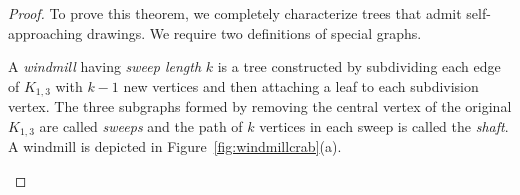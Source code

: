 \documentclass[11pt]{article}
\newcommand{\changeAL}[1]{{#1}}
\begin{document}
\begin{proof}
To prove this theorem, we completely characterize trees that admit self-approaching drawings.  We require two definitions of special graphs.

A \emph{windmill} having \emph{sweep length} $k$ is a tree constructed by subdividing
each edge of $K_{1,3}$ with $k-1$ new vertices
and then attaching a leaf to each subdivision vertex.
\changeAL{The three subgraphs formed by removing the central vertex of the original $K_{1,3}$ are called \emph{sweeps} and the path of $k$ vertices in each sweep is called the \emph{shaft}.}
A windmill is depicted in Figure~\ref{fig:windmillcrab}(a).

\begin{figure}
\begin{center}
\hspace*{\fill}
\hspace*{\fill}
\end{center}
\end{figure}
\end{proof}
\end{document}
